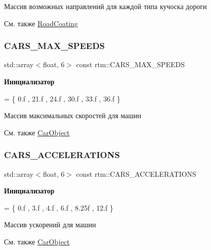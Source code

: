 Массив возможных направлений для каждой типа кучоска дороги \begin{DoxySeeAlso}{См. также}
\hyperlink{classrtm_1_1_road_coating}{Road\+Coating} 
\end{DoxySeeAlso}
\mbox{\label{namespacertm_ab4d4feaa707f2d1eba41feae3b46451f}} 
\subsubsection{\texorpdfstring{C\+A\+R\+S\+\_\+\+M\+A\+X\+\_\+\+S\+P\+E\+E\+DS}{CARS\_MAX\_SPEEDS}}
{\footnotesize\ttfamily std\+::array$<$float, 6$>$ const rtm\+::\+C\+A\+R\+S\+\_\+\+M\+A\+X\+\_\+\+S\+P\+E\+E\+DS}

{\bfseries Инициализатор}
\begin{DoxyCode}
= \{
          0.f   
        , 21.f  
        , 24.f  
        , 30.f  
        , 33.f  
        , 36.f  
    \}
\end{DoxyCode}
Массив максимальных скоростей для машин \begin{DoxySeeAlso}{См. также}
\hyperlink{classrtm_1_1_car_object}{Car\+Object} 
\end{DoxySeeAlso}
\mbox{\label{namespacertm_acac83b872b644793530e7f6f4660c85e}} 
\subsubsection{\texorpdfstring{C\+A\+R\+S\+\_\+\+A\+C\+C\+E\+L\+E\+R\+A\+T\+I\+O\+NS}{CARS\_ACCELERATIONS}}
{\footnotesize\ttfamily std\+::array$<$float, 6$>$ const rtm\+::\+C\+A\+R\+S\+\_\+\+A\+C\+C\+E\+L\+E\+R\+A\+T\+I\+O\+NS}

{\bfseries Инициализатор}
\begin{DoxyCode}
= \{
          0.f   
        , 3.f   
        , 4.f   
        , 6.f   
        , 8.25f 
        , 12.f  
    \}
\end{DoxyCode}
Массив ускорений для машин \begin{DoxySeeAlso}{См. также}
\hyperlink{classrtm_1_1_car_object}{Car\+Object} 
\end{DoxySeeAlso}
